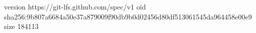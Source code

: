 version https://git-lfs.github.com/spec/v1
oid sha256:9b807a6684a50e37a879009f90db9b0d02456d80df513061545da964458e00e9
size 184113
